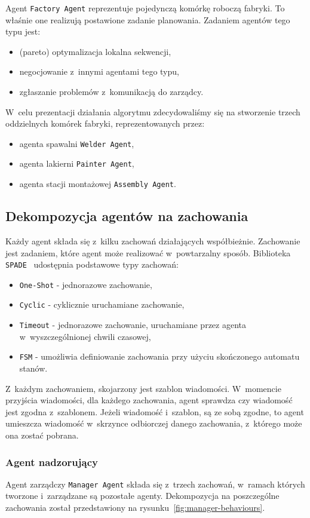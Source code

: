 Agent \texttt{Factory Agent} reprezentuje pojedynczą komórkę roboczą fabryki. To właśnie one realizują postawione zadanie planowania. Zadaniem agentów tego typu jest:
\begin{itemize}
    \item (pareto) optymalizacja lokalna sekwencji,
    \item negocjowanie z~innymi agentami tego typu,
    \item zgłaszanie problemów z~komunikacją do zarządcy.
\end{itemize}

W~celu prezentacji działania algorytmu zdecydowaliśmy się na stworzenie trzech oddzielnych komórek fabryki, reprezentowanych przez:
\begin{itemize}
    \item agenta spawalni \texttt{Welder Agent},
    \item agenta lakierni \texttt{Painter Agent},
    \item agenta stacji montażowej \texttt{Assembly Agent}.
\end{itemize}

\subsection{Dekompozycja agentów na zachowania}
Każdy agent składa się z~kilku zachowań działających współbieżnie. Zachowanie jest zadaniem, które agent może realizować w~powtarzalny sposób. Biblioteka \texttt{SPADE}~\cite{spade} udostępnia podstawowe typy zachowań:
\begin{itemize}
    \item \texttt{One-Shot} - jednorazowe zachowanie,
    \item \texttt{Cyclic} - cyklicznie uruchamiane zachowanie,
    \item \texttt{Timeout} - jednorazowe zachowanie, uruchamiane przez agenta w~wyszczególnionej chwili czasowej,
    \item \texttt{FSM} - umożliwia definiowanie zachowania przy użyciu skończonego automatu stanów.
\end{itemize}

Z~każdym zachowaniem, skojarzony jest szablon wiadomości. W~momencie przyjścia wiadomości, dla każdego zachowania, agent sprawdza czy wiadomość jest zgodna z~szablonem. Jeżeli wiadomość i~szablon, są ze sobą zgodne, to agent umieszcza wiadomość w~skrzynce odbiorczej danego zachowania, z~którego może ona zostać pobrana. 

\subsubsection{Agent nadzorujący}
Agent zarządczy \texttt{Manager Agent} składa się z~trzech zachowań, w~ramach których tworzone i~zarządzane są pozostałe agenty. Dekompozycja na poszczególne zachowania został przedstawiony na rysunku~\ref{fig:manager-behaviours}.

